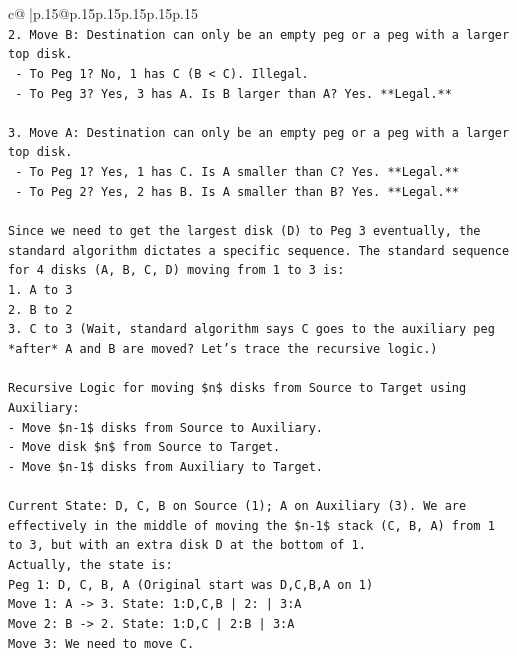\documentclass{article}
\begin{document}
{\begin{supertabular}{c@{$\;$}|p{.15\linewidth}@{}p{.15\linewidth}p{.15\linewidth}p{.15\linewidth}p{.15\linewidth}p{.15\linewidth}}
{{{\\ 
\texttt{2. Move B: Destination can only be an empty peg or a peg with a larger top disk.} \\
\texttt{   {-} To Peg 1? No, 1 has C (B < C). Illegal.} \\
\texttt{   {-} To Peg 3? Yes, 3 has A. Is B larger than A? Yes. **Legal.**} \\
\\ 
\texttt{3. Move A: Destination can only be an empty peg or a peg with a larger top disk.} \\
\texttt{   {-} To Peg 1? Yes, 1 has C. Is A smaller than C? Yes. **Legal.**} \\
\texttt{   {-} To Peg 2? Yes, 2 has B. Is A smaller than B? Yes. **Legal.**} \\
\\ 
\texttt{Since we need to get the largest disk (D) to Peg 3 eventually, the standard algorithm dictates a specific sequence. The standard sequence for 4 disks (A, B, C, D) moving from 1 to 3 is:} \\
\texttt{1. A to 3} \\
\texttt{2. B to 2} \\
\texttt{3. C to 3 (Wait, standard algorithm says C goes to the auxiliary peg *after* A and B are moved? Let's trace the recursive logic.)} \\
\\ 
\texttt{Recursive Logic for moving \$n\$ disks from Source to Target using Auxiliary:} \\
\texttt{{-} Move \$n{-}1\$ disks from Source to Auxiliary.} \\
\texttt{{-} Move disk \$n\$ from Source to Target.} \\
\texttt{{-} Move \$n{-}1\$ disks from Auxiliary to Target.} \\
\\ 
\texttt{Current State: D, C, B on Source (1); A on Auxiliary (3). We are effectively in the middle of moving the \$n{-}1\$ stack (C, B, A) from 1 to 3, but with an extra disk D at the bottom of 1.} \\
\texttt{Actually, the state is:} \\
\texttt{Peg 1: D, C, B, A (Original start was D,C,B,A on 1)} \\
\texttt{Move 1: A {-}> 3. State: 1:D,C,B | 2: | 3:A} \\
\texttt{Move 2: B {-}> 2. State: 1:D,C | 2:B | 3:A} \\
\texttt{Move 3: We need to move C.} \\
}}}
\end{supertabular}}
\end{document}
